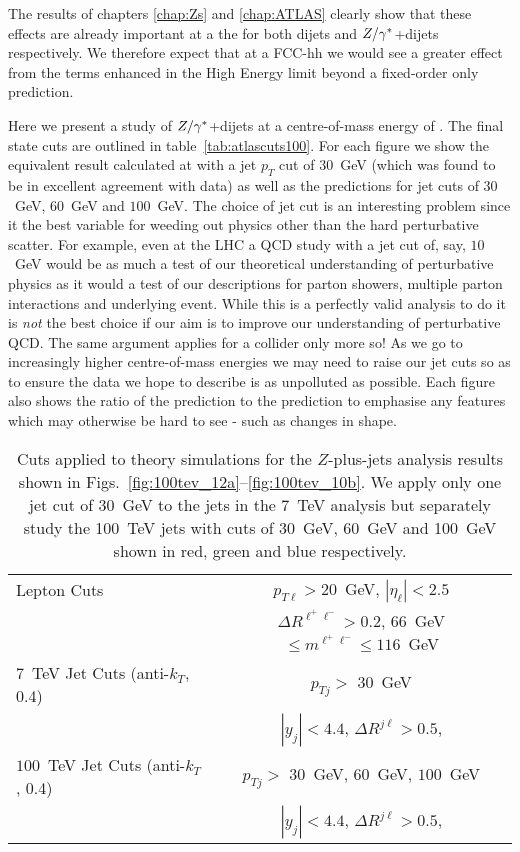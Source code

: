 	The results of chapters \ref{chap:Zs} and \ref{chap:ATLAS} clearly show that these effects are already important
	at a the \stev for both dijets and $Z/\gamma^*$+dijets respectively.  We therefore expect that at a \htev FCC-hh we would
	see a greater effect from the terms enhanced in the High Energy limit beyond a fixed-order only prediction.

	Here we present a study of $Z/\gamma^*$+dijets at a centre-of-mass energy of \htev.  The final state cuts
	are outlined in table~\eqref{tab:atlascuts100}.  For each figure we show the equivalent result calculated
	at \stev with a jet $p_T$ cut of $30$~GeV (which was found to be in excellent agreement with data) as
	well as the \htev predictions for jet cuts of $30$~GeV, $60$~GeV and $100$~GeV.  The choice of jet cut
	is an interesting problem since it the best variable for weeding out physics other than the hard
	perturbative scatter.  For example, even at the \stev LHC a QCD study with a jet cut of, say,
	$10$~GeV would be as much a test of our theoretical understanding of perturbative physics as it would
	a test of our descriptions for parton showers, multiple parton interactions and underlying event.
	While this is a perfectly valid analysis to do it is \emph{not} the best choice if our aim is to
	improve our understanding of perturbative QCD.  The same argument applies for a \htev collider
	only more so!  As we go to increasingly higher centre-of-mass energies we may need to raise our
	jet cuts so as to ensure the data we hope to describe is as unpolluted as possible.  Each figure
	also shows the ratio of the \htev prediction to the \stev prediction to emphasise any features
	which may otherwise be hard to see - such as changes in shape.

	\begin{table}[bth]
	  \centering
	  \begin{tabular}{|l|c|}
	    \hline
	    Lepton Cuts & $p_{T\ell}>20$~GeV, \; $|\eta_\ell|<2.5$ \\
	    & $\Delta R^{\ell^+\ell^-} > 0.2$, \; $66$~GeV $\leq m^{\ell^+\ell^-} \leq
	      116$~GeV \\ \hline
	    $7$~TeV Jet Cuts (anti-$k_T$, 0.4) & $p_{Tj}>$ $30$~GeV \\
	    &  $|y_j|<4.4$, \;$\Delta R^{j\ell} >0.5$,  \\ \hline
	    $100$~TeV Jet Cuts (anti-$k_T$, 0.4) & $p_{Tj}>$ $30$~GeV, $60$~GeV, $100$~GeV \\
	    &  $|y_j|<4.4$, \;$\Delta R^{j\ell} >0.5$,  \\ \hline
	  \end{tabular}
	  \caption{Cuts applied to theory simulations for the \htev
	    $Z$-plus-jets analysis results shown in Figs.~\eqref{fig:100tev_12a}--\eqref{fig:100tev_10b}.  We apply only one
	    jet cut of 30~GeV to the jets in the 7~TeV analysis but separately study the 100~TeV jets with cuts of
	    30~GeV, 60~GeV and 100~GeV shown in red, green and blue respectively.}
	  \label{tab:atlascuts100}
	\end{table}

